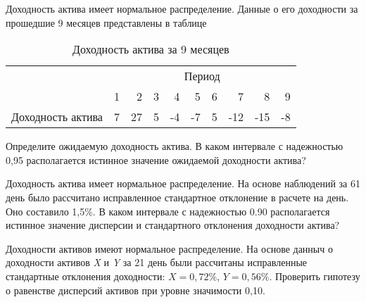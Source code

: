 \documentclass[12pt,a4paper]{article}
\begin{document}
\begin{taskrus}
Доходность актива имеет нормальное распределение. Данные о его доходности за прошедшие 9 месяцев представлены в таблице
\begin{table}[H]
  \centering
  \caption{Доходность актива за 9 месяцев}
    \begin{tabular}{rrrrrrrrrr}
    \toprule
    \multicolumn{1}{c}{} & \multicolumn{9}{c}{Период} \\\cmidrule{2-10}
    \multicolumn{1}{c}{} & 1     & 2     & 3     & 4     & 5     & 6     & 7     & 8     & 9 \\
    \midrule
    \multicolumn{1}{l}{Доходность актива} & 7     & 27    & 5     & -4    & -7    & 5     & -12   & -15   & -8 \\
    \bottomrule
    \end{tabular}%
  \label{tab:addlabel}%
\end{table}%

Определите ожидаемую доходность актива. В каком интервале с надежностью 0,95 располагается истинное значение ожидаемой доходности актива?

\end{taskrus}

\begin{taskrus}
Доходность актива имеет нормальное распределение. На основе наблюдений за 61 день было рассчитано исправленное стандартное отклонение в расчете на день. Оно составило 1,5\%. В каком интервале с надежностью 0.90 располагается истинное значение дисперсии и стандартного отклонения доходности актива?
\end{taskrus}

\begin{taskrus}
Доходности активов имеют нормальное распределение. На основе данныч о доходности активов \textit{X} и \textit{Y} за 21 день были рассчитаны исправленные стандартные отклонения доходности: $X=0,72\%$, $Y = 0,56\%$. Проверить гипотезу о равенстве дисперсий активов при уровне значимости 0,10.
\end{taskrus}
\end{document}
